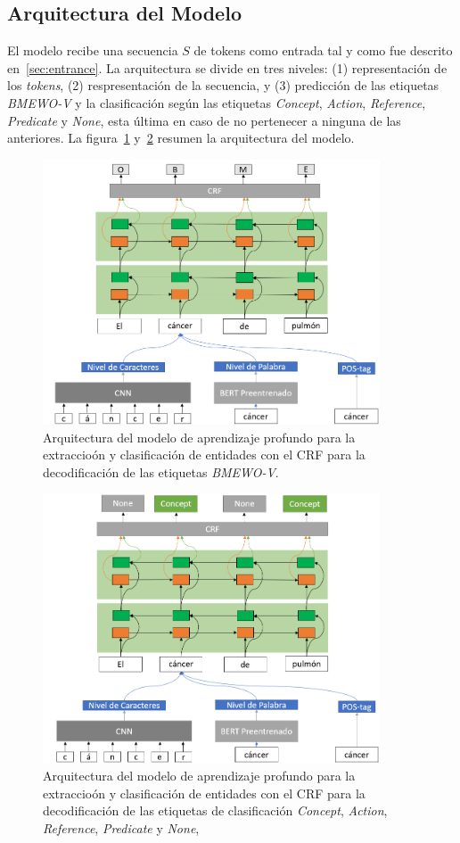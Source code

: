 \subsection{Arquitectura del Modelo}

El modelo recibe una secuencia $S$ de tokens como entrada tal y como fue descrito en~\ref{sec:entrance}. La arquitectura se divide en tres niveles: (1) representaci\'on de los \emph{tokens}, (2) respresentaci\'on de la secuencia, y (3) predicci\'on de las etiquetas \emph{BMEWO-V} y la clasificaci\'on seg\'un las etiquetas \emph{Concept}, \emph{Action}, \emph{Reference}, \emph{Predicate} y \emph{None}, esta \'ultima en caso de no pertenecer a ninguna de las anteriores. La figura~\ref{fig:ArcModRec} y~\ref{fig:ArcModClass} resumen la arquitectura del modelo.


\begin{figure}[h!]
	\centering
	\includegraphics[width = 10cm]{Imagenes/EntitiesModelRec.png}
	\caption{Arquitectura del modelo de aprendizaje profundo para la extraccio\'on y clasificaci\'on de entidades con el CRF para la decodificaci\'on de las etiquetas \emph{BMEWO-V}.}\label{fig:ArcModRec}
\end{figure}

\begin{figure}[h!]
	\centering
	\includegraphics[width = 10cm]{Imagenes/EntitiesModelClas.png}
	\caption{Arquitectura del modelo de aprendizaje profundo para la extraccio\'on y clasificaci\'on de entidades con el CRF para la decodificaci\'on de las etiquetas de clasificaci\'on \emph{Concept}, \emph{Action}, \emph{Reference}, \emph{Predicate} y \emph{None},}\label{fig:ArcModClass}
\end{figure}

